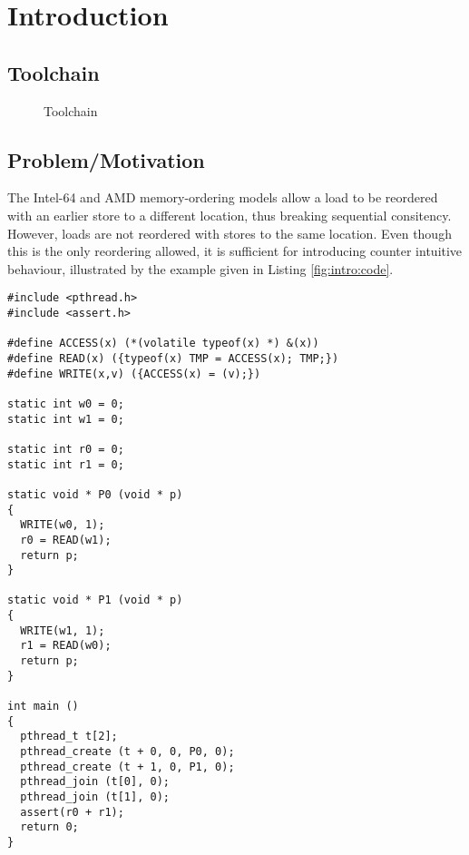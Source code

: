 \section{Introduction}

\subsection{Toolchain}

\begin{figure}[h]
  \centering
  
  \caption{Toolchain}
\end{figure}


\subsection{Problem/Motivation}

 \noindent
The Intel-64 and AMD memory-ordering models allow a load to be reordered with an earlier store to a different location, thus breaking sequential consitency.
However, loads are not reordered with stores to the same location.
Even though this is the only reordering allowed, it is sufficient for introducing counter intuitive behaviour, illustrated by the example given in Listing \ref{fig:intro:code}.

\newpage

\begin{lstlisting}[style=c++, caption={Store Buffer Litmus Test}, label={fig:intro:code}]
#include <pthread.h>
#include <assert.h>

#define ACCESS(x) (*(volatile typeof(x) *) &(x))
#define READ(x) ({typeof(x) TMP = ACCESS(x); TMP;})
#define WRITE(x,v) ({ACCESS(x) = (v);})

static int w0 = 0;
static int w1 = 0;

static int r0 = 0;
static int r1 = 0;

static void * P0 (void * p)
{
  WRITE(w0, 1);
  r0 = READ(w1);
  return p;
}

static void * P1 (void * p)
{
  WRITE(w1, 1);
  r1 = READ(w0);
  return p;
}

int main ()
{
  pthread_t t[2];
  pthread_create (t + 0, 0, P0, 0);
  pthread_create (t + 1, 0, P1, 0);
  pthread_join (t[0], 0);
  pthread_join (t[1], 0);
  assert(r0 + r1);
  return 0;
}
\end{lstlisting}

